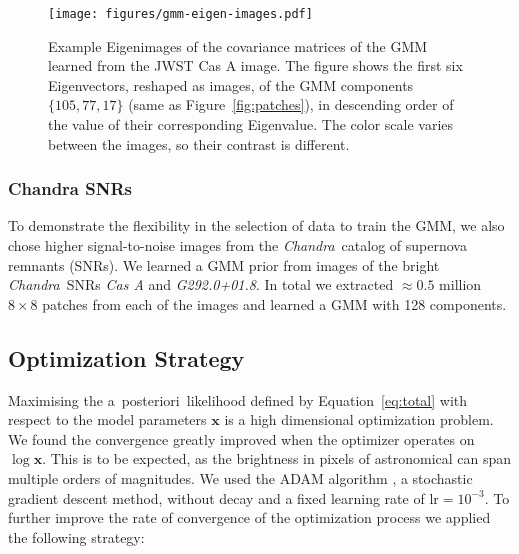 \documentclass[twocolumn]{aastex631}
\newcommand{\chandra}{\textit{Chandra}~}
\newcommand{\aposteriori}{a~posteriori~}
\newcommand{\todo}[1]{\textcolor{red}{TODO: #1}\PackageWarning{TODO:}{#1!}}
\begin{document}

    \begin{figure}
        \begin{centering}
            \texttt{[image: figures/gmm-eigen-images.pdf]}
            \caption{
                Example Eigenimages of the covariance matrices of the GMM learned from the JWST Cas A image. The figure shows the first six Eigenvectors, reshaped as images, of the GMM components $\{105, 77, 17\}$ (same as Figure~\ref{fig:patches}), in descending order of the value of their corresponding Eigenvalue. The color scale varies between the images, so their contrast is different. 
            }
            \label{fig:gmm-eigen-images}
        \end{centering}
    \end{figure}

    \subsubsection{Chandra SNRs}
    \label{sssec:chandra-snrs}
    To demonstrate the flexibility in the selection of data to train the GMM, we also chose higher signal-to-noise images from the \chandra catalog of supernova remnants (SNRs). We learned a GMM prior from images of the bright \chandra SNRs \textit{Cas A} and \textit{G292.0+01.8}. In total we extracted $\approx 0.5$ million $8\times 8$ patches from each of the images and learned a GMM with 128 components.

    \subsection{Optimization Strategy}
    \label{sec:opt-strategy}
    Maximising the \aposteriori likelihood defined by Equation~\ref{eq:total} with respect to the model parameters $\mathbf{x}$ is a high dimensional optimization problem. We found the convergence greatly improved when the optimizer operates on $\log{\mathbf{x}}$. This is to be expected, as the brightness in pixels of astronomical can span multiple orders of magnitudes. We used the ADAM algorithm \citep{Kingma2014}, a stochastic gradient descent method, without decay and a fixed learning rate of $\mathrm{lr}=10^{-3}$. To further improve the rate of convergence of the optimization process we applied the following strategy:
\end{document}
